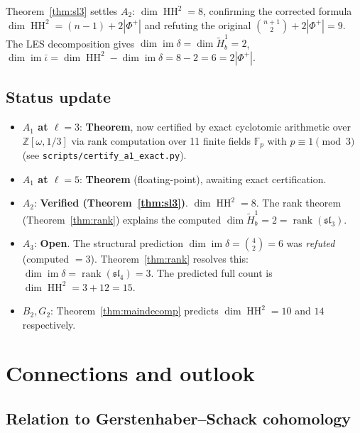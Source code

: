 \documentclass[11pt,letterpaper]{amsart}
\theoremstyle{plain}
\theoremstyle{definition}
\theoremstyle{remark}
\newcommand{\HH}{\operatorname{HH}}
\begin{document}
Theorem~\ref{thm:sl3} settles $A_2$: $\dim \HH^2 = 8$, confirming the corrected formula $\dim \HH^2 = (n-1) + 2|\Phi^+|$ and refuting the original $\binom{n+1}{2} + 2|\Phi^+| = 9$. The LES decomposition gives $\dim \operatorname{im} \delta = \dim \tilde{H}^1_b = 2$, $\dim \operatorname{im} \bar\iota = \dim \HH^2 - \dim \operatorname{im} \delta = 8 - 2 = 6 = 2|\Phi^+|$.

\subsection{Status update}

\begin{itemize}
\item \textbf{$A_1$ at $\ell = 3$}: \textbf{Theorem}, now certified by exact cyclotomic arithmetic over $\mathbb{Z}[\omega, 1/3]$ via rank computation over 11 finite fields $\mathbb{F}_p$ with $p \equiv 1 \pmod{3}$ (see \texttt{scripts/certify\_a1\_exact.py}).
\item \textbf{$A_1$ at $\ell = 5$}: \textbf{Theorem} (floating-point), awaiting exact certification.
\item \textbf{$A_2$}: \textbf{Verified (Theorem~\ref{thm:sl3})}. $\dim \HH^2 = 8$. The rank theorem (Theorem~\ref{thm:rank}) explains the computed $\dim \tilde{H}^1_b = 2 = \operatorname{rank}(\mathfrak{sl}_3)$.
\item \textbf{$A_3$}: \textbf{Open}. The structural prediction $\dim \operatorname{im} \delta = \binom{4}{2} = 6$ was \emph{refuted} (computed $= 3$). Theorem~\ref{thm:rank} resolves this: $\dim \operatorname{im} \delta = \operatorname{rank}(\mathfrak{sl}_4) = 3$. The predicted full count is $\dim \HH^2 = 3 + 12 = 15$.
\item \textbf{$B_2, G_2$}: Theorem~\ref{thm:maindecomp} predicts $\dim \HH^2 = 10$ and $14$ respectively.
\end{itemize}



\section{Connections and outlook}
\label{sec:connections}
\subsection{Relation to Gerstenhaber--Schack cohomology}
\end{document}
